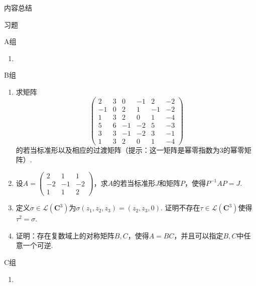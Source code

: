 \vspace{2ex}
\centerline{\heiti \Large 内容总结}

\vspace{2ex}
\centerline{\heiti \Large 习题}

\vspace{2ex}
{\kaishu }
\begin{flushright}
    \kaishu

\end{flushright}

\centerline{\heiti A组}
\begin{enumerate}
    \item
\end{enumerate}

\centerline{\heiti B组}
\begin{enumerate}
    \item 求矩阵\[\begin{pmatrix}
                  2 & 3 & 0  & -1 & 2 & -2 \\ -1 & 0 & 2 & 1 & -1 & -2 \\
                  1 & 3 & 2  & 0  & 1 & -4 \\ 5 & 6 & -1 & -2 & 5 & -3 \\
                  3 & 3 & -1 & -2 & 3 & -1 \\ 1 & 3 & 2 & 0 & 1 & -4
              \end{pmatrix}\]的若当标准形以及相应的过渡矩阵（提示：这一矩阵是幂零指数为3的幂零矩阵）.

    \item 设$A=\begin{pmatrix}
                  2 & 1 & 1 \\ -2 & -1 & -2 \\ 1 & 1 & 2
              \end{pmatrix}$，求$A$的若当标准形$J$和矩阵$P$，使得$P^{-1}AP=J$.

    \item 定义$\sigma\in \mathcal{L}(\mathbf{C}^3)$为$\sigma(z_1,z_2,z_3)=(z_2,z_3,0)$. 证明不存在$\tau\in \mathcal{L}(\mathbf{C}^3)$使得$\tau^2=\sigma$.

    \item 证明：存在复数域上的对称矩阵$B,C$，使得$A=BC$，并且可以指定$B,C$中任意一个可逆.
\end{enumerate}

\centerline{\heiti C组}
\begin{enumerate}
    \item
\end{enumerate}
